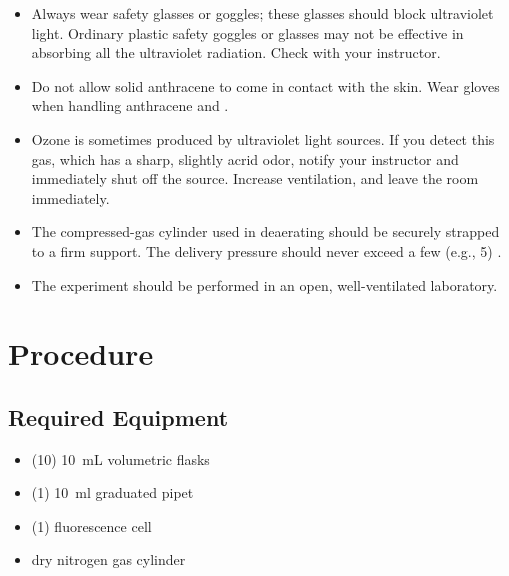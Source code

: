 \begin{itemize}
	\item Always wear safety glasses or goggles; these glasses should block ultraviolet light. 
	Ordinary plastic safety goggles or glasses may not be effective in absorbing all the ultraviolet radiation. 
	Check with your instructor.
	\item Do not allow solid anthracene to come in contact with the skin. 
	Wear gloves when handling anthracene and .
	\item Ozone is sometimes produced by ultraviolet light sources. 
	If you detect this gas, which has a sharp, slightly acrid odor, notify your instructor and immediately shut off the source.
	Increase ventilation, and leave the room immediately.
	\item The compressed-gas cylinder used in deaerating should be securely strapped to a firm support.
	The delivery pressure should never exceed a few (e.g., 5) \unit{\psig}.
	\item The experiment should be performed in an open, well-ventilated laboratory.
\end{itemize}


\section{Procedure} %
\label{sec:procedure}

\subsection{Required Equipment} %
\label{sub:required_equipment}

\begin{itemize}
	\item (10) \qty{10}{\mL} volumetric flasks
	\item (1) \qty{10}{\ml} graduated pipet
	\item (1) fluorescence cell
	\item dry nitrogen gas cylinder
\end{itemize}



